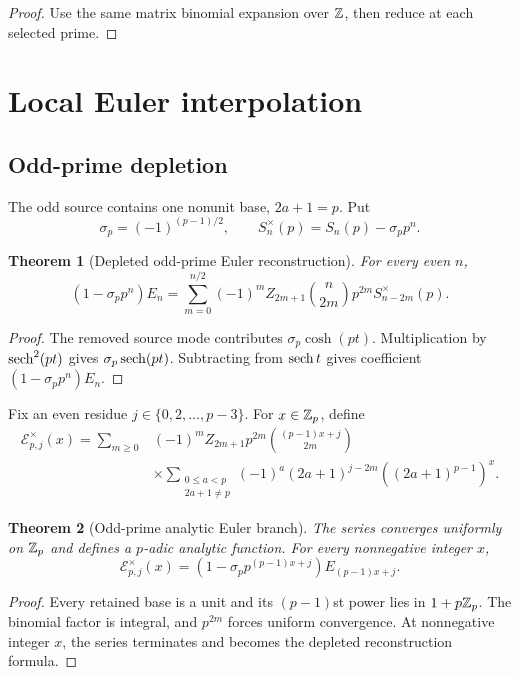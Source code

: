 \documentclass[11pt]{article}
\newtheorem{theorem}{Theorem}[section]\newtheorem{proposition}[theorem]{Proposition}\newtheorem{lemma}[theorem]{Lemma}\newtheorem{corollary}[theorem]{Corollary}
\theoremstyle{definition}\newtheorem{definition}[theorem]{Definition}\newtheorem{example}[theorem]{Example}\newtheorem{construction}[theorem]{Construction}\newtheorem{algorithm}[theorem]{Algorithm}\newtheorem{conjecture}[theorem]{Conjecture}\newtheorem{problem}[theorem]{Problem}
\theoremstyle{remark}\newtheorem{remark}[theorem]{Remark}\newtheorem{boundary}[theorem]{Boundary}\newtheorem{certificate}[theorem]{Computational Certificate}\newtheorem{classical}[theorem]{Classical Input}\newtheorem{principle}[theorem]{Structural Principle}
\begin{document}
\begin{proof}
Use the same matrix binomial expansion over $\mathbb Z$, then reduce at each selected prime.
\end{proof}

\section{Local Euler interpolation}

\subsection{Odd-prime depletion}
The odd source contains one nonunit base, $2a+1=p$. Put
\[
 \sigma_p=(-1)^{(p-1)/2},\qquad S_n^\times(p)=S_n(p)-\sigma_pp^n.
\]

\begin{theorem}[Depleted odd-prime Euler reconstruction]
For every even $n$,
\[
 \boxed{(1-\sigma_pp^n)E_n=\sum_{m=0}^{n/2}(-1)^mZ_{2m+1}\binom n{2m}p^{2m}S_{n-2m}^\times(p).}
\]
\end{theorem}

\begin{proof}
The removed source mode contributes $\sigma_p\cosh(pt)$. Multiplication by $\operatorname{sech}^2(pt)$ gives $\sigma_p\operatorname{sech}(pt)$. Subtracting from $\operatorname{sech} t$ gives coefficient $(1-\sigma_pp^n)E_n$.
\end{proof}

Fix an even residue $j\in\{0,2,\ldots,p-3\}$. For $x\in\mathbb Z_p$, define
\[
 \begin{aligned}
 \mathscr E_{p,j}^\times(x)=\sum_{m\geq0}
 &(-1)^mZ_{2m+1}p^{2m}\binom{(p-1)x+j}{2m}\\
 &\times\sum_{\substack{0\leq a<p\\2a+1\neq p}}
 (-1)^a(2a+1)^{j-2m}\left((2a+1)^{p-1}\right)^x.
 \end{aligned}
\]

\begin{theorem}[Odd-prime analytic Euler branch]
The series converges uniformly on $\mathbb Z_p$ and defines a $p$-adic analytic function. For every nonnegative integer $x$,
\[
 \boxed{\mathscr E_{p,j}^\times(x)=\left(1-\sigma_pp^{(p-1)x+j}\right)E_{(p-1)x+j}.}
\]
\end{theorem}

\begin{proof}
Every retained base is a unit and its $(p-1)$st power lies in $1+p\mathbb Z_p$. The binomial factor is integral, and $p^{2m}$ forces uniform convergence. At nonnegative integer $x$, the series terminates and becomes the depleted reconstruction formula.
\end{proof}
\end{document}
